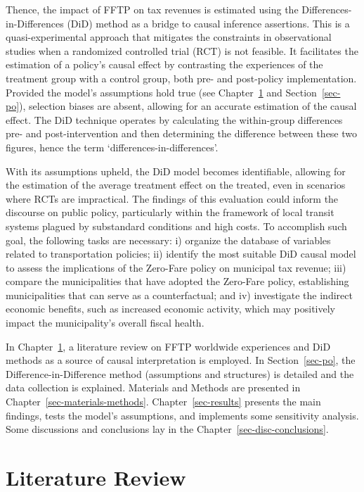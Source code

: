 \documentclass[12pt, a4paper, twoside]{article}
\numberwithin{equation}{subsection} %
\begin{document}
Thence, the impact of FFTP on tax revenues is estimated using the
Differences-in-Differences (DiD) method as a bridge to causal inference
assertions. This is a quasi-experimental approach that mitigates the
constraints in observational studies when a randomized controlled trial
(RCT) is not feasible. It facilitates the estimation of a policy's
causal effect by contrasting the experiences of the treatment group with
a control group, both pre- and post-policy implementation. Provided the
model's assumptions hold true (see Chapter~\ref{sec-literature-review}
and Section~\ref{sec-po}), selection biases are absent, allowing for an
accurate estimation of the causal effect. The DiD technique operates by
calculating the within-group differences pre- and post-intervention and
then determining the difference between these two figures, hence the
term `differences-in-differences'.

With its assumptions upheld, the DiD model becomes identifiable,
allowing for the estimation of the average treatment effect on the
treated, even in scenarios where RCTs are impractical. The findings of
this evaluation could inform the discourse on public policy,
particularly within the framework of local transit systems plagued by
substandard conditions and high costs. To accomplish such goal, the
following tasks are necessary: i) organize the database of variables
related to transportation policies; ii) identify the most suitable DiD
causal model to assess the implications of the Zero-Fare policy on
municipal tax revenue; iii) compare the municipalities that have adopted
the Zero-Fare policy, establishing municipalities that can serve as a
counterfactual; and iv) investigate the indirect economic benefits, such
as increased economic activity, which may positively impact the
municipality's overall fiscal health.

In Chapter~\ref{sec-literature-review}, a literature review on FFTP
worldwide experiences and DiD methods as a source of causal
interpretation is employed. In Section~\ref{sec-po}, the
Difference-in-Difference method (assumptions and structures) is detailed
and the data collection is explained. Materials and Methods are
presented in Chapter~\ref{sec-materials-methods}.
Chapter~\ref{sec-results} presents the main findings, tests the model's
assumptions, and implements some sensitivity analysis. Some discussions
and conclusions lay in the Chapter~\ref{sec-disc-conclusions}.

\newpage

\hypertarget{sec-literature-review}{%
\section{Literature Review}\label{sec-literature-review}}
\end{document}
